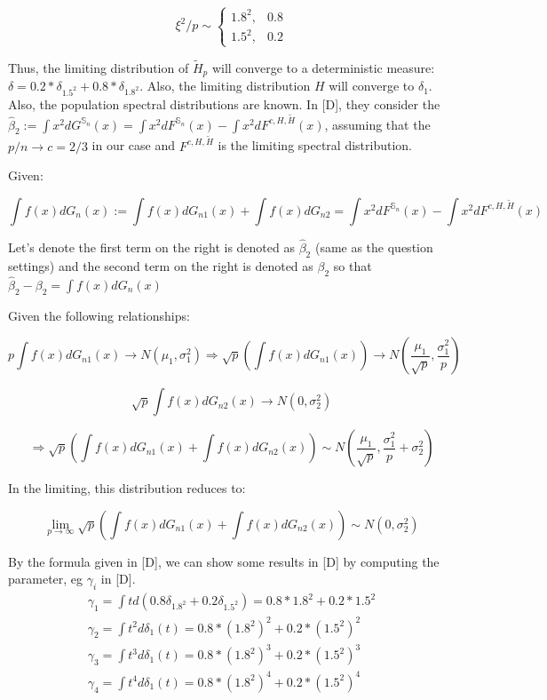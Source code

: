 \documentclass[
]{article}
\begin{document}
\[
\xi^2/p \sim
\left\{
\begin{array}{cc}
1.8^2, & 0.8 \\
1.5^2, & 0.2
\end{array}
\right.
\]

Thus, the limiting distribution of \(\tilde H_p\) will converge to a
deterministic measure:
\(\delta = 0.2*\delta_{1.5^2} + 0.8*\delta_{1.8^2}\). Also, the limiting
distribution \(H\) will converge to \(\delta_1\). Also, the population
spectral distributions are known. In {[}D{]}, they consider the
\(\hat{\beta}_2 := \int x^2dG^{\mathbb{S}_n}(x) = \int x^2dF^{\mathbb{S}_n}(x) - \int x^2dF^{c, H, \tilde H}(x)\),
assuming that the \(p/n \rightarrow c = 2/3\) in our case and
\(F^{c, H, \tilde H}\) is the limiting spectral distribution.

Given:

\[ 
\int f(x) dG_n(x) := \int f(x) d G_{n1} (x) + \int f(x) d G_{n2} = \int x^2dF^{\mathbb{S}_n}(x) - \int x^2dF^{c, H, \tilde H}(x) 
\]

Let's denote the first term on the right is denoted as \(\hat\beta_2\)
(same as the question settings) and the second term on the right is
denoted as \(\beta_2\) so that
\(\hat\beta_2 - \beta_2 = \int f(x) dG_n(x)\)

Given the following relationships:

\[
p\int f(x) dG_{n1}(x) \rightarrow N(\mu_1, \sigma_1^2) \Rightarrow \sqrt p (\int f(x) dG_{n1}(x)) \rightarrow N(\frac{\mu_1}{\sqrt p}, \frac{\sigma_1^2}{p})
\]

\[
\sqrt p \int f(x) d G_{n2} (x) \rightarrow N(0, \sigma_2^2)
\]

\[
\Rightarrow \sqrt p (\int f(x) d G_{n1} (x) + \int f(x) d G_{n2}(x) ) \sim N(\frac{\mu_1}{\sqrt p}, \frac{\sigma_1^2}{p} + \sigma_2^2)
\]

In the limiting, this distribution reduces to:

\[
\lim_{p \rightarrow \infty} \sqrt p (\int f(x) d G_{n1} (x) + \int f(x) d G_{n2}(x) ) \sim N(0, \sigma_2^2)
\]

By the formula given in {[}D{]}, we can show some results in {[}D{]} by
computing the parameter, eg \(\gamma_i\) in {[}D{]}. \begin{align*}
\gamma_1 = \int t d(0.8\delta_{1.8^2} + 0.2\delta_{1.5^2}) = 0.8*1.8^2+0.2*1.5^2\\
\gamma_2 = \int t^2 d \delta_1(t) = 0.8*(1.8^2)^2+0.2*(1.5^2)^2\\
\gamma_3 = \int t^3 d\delta_1(t) = 0.8*(1.8^2)^3+0.2*(1.5^2)^3\\
\gamma_4 = \int t^4 d\delta_1(t) = 0.8*(1.8^2)^4+0.2*(1.5^2)^4\\
\end{align*}
\end{document}

